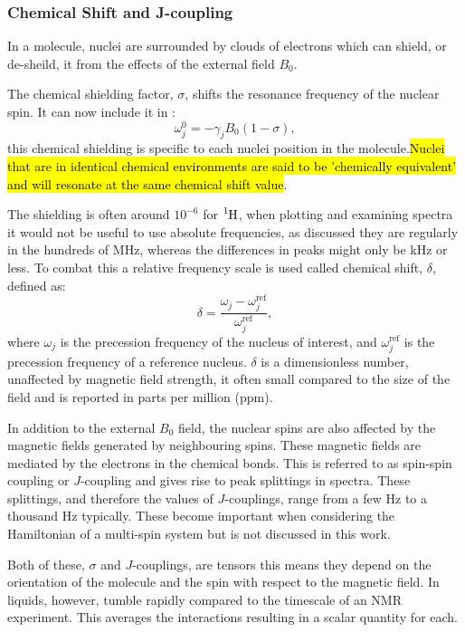 \subsubsection{Chemical Shift and J-coupling}

In a molecule, nuclei are surrounded by clouds of electrons which can shield, or de-sheild, it
from the effects of the external field $B_0$.

The chemical shielding factor, $\sigma$, shifts the resonance frequency of the nuclear spin. It
can now include it in :
\begin{equation}
  \omega_j^0 = -\gamma_jB_0(1-\sigma),
\end{equation}
this chemical shielding is specific to each nuclei position in the molecule.\hl{Nuclei that are in
identical chemical environments are said to be 'chemically equivalent' and will resonate at the same
chemical shift value}.

The shielding is often around $10^{-6}$ for $\ce{^1H}$, when plotting and examining spectra
it would not be useful to use absolute frequencies, as discussed they are regularly in the hundreds of MHz,
whereas the differences in peaks might only be kHz or less. To combat this a relative frequency scale is used
called chemical shift, $\delta$, defined as:
\begin{equation}
  \delta = \frac{\omega_j-\omega^\text{ref}_j}{\omega^\text{ref}_j},
\end{equation}
where $\omega_j$ is the precession frequency of the nucleus of interest, and $\omega^\text{ref}_j$ is the precession
frequency of a reference nucleus. $\delta$ is a dimensionless number, unaffected by magnetic field strength, it often
small compared to the size of the field and is reported in parts per million (ppm).

In addition to the external $B_0$ field, the nuclear spins are also affected by the magnetic fields generated
by neighbouring spins. These magnetic fields are mediated by the electrons in the chemical bonds. This is referred to as
spin-spin coupling or $J$-coupling and gives rise to peak splittings in spectra. These splittings, and therefore the values
of $J$-couplings, range from a few Hz to a thousand Hz typically. These become important when considering the
Hamiltonian of a multi-spin system but is not discussed in this work.

Both of these, $\sigma$ and $J$-couplings, are tensors this means they depend on the orientation of the molecule
and the spin with respect to the magnetic field. In liquids, however, tumble rapidly compared to the timescale
of an NMR experiment. This averages the interactions resulting in a scalar quantity for each.

